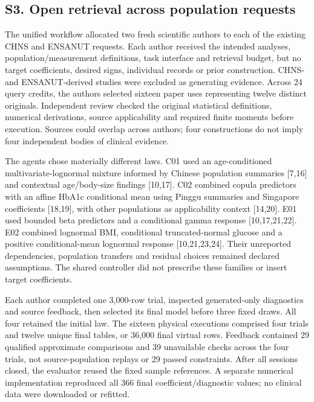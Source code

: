 \documentclass[10pt,twocolumn]{article}
\begin{document}
\subsection*{S3. Open retrieval across population requests}

The unified workflow allocated two fresh scientific authors to each of the existing CHNS and ENSANUT requests. Each author received the intended analyses, population/measurement definitions, task interface and retrieval budget, but no target coefficients, desired signs, individual records or prior construction. CHNS- and ENSANUT-derived studies were excluded as generating evidence. Across 24 query credits, the authors selected sixteen paper uses representing twelve distinct originals. Independent review checked the original statistical definitions, numerical derivations, source applicability and required finite moments before execution. Sources could overlap across authors; four constructions do not imply four independent bodies of clinical evidence.


The agents chose materially different laws. C01 used an age-conditioned multivariate-lognormal mixture informed by Chinese population summaries [7,16] and contextual age/body-size findings [10,17]. C02 combined copula predictors with an affine HbA1c conditional mean using Pinggu summaries and Singapore coefficients [18,19], with other populations as applicability context [14,20]. E01 used bounded beta predictors and a conditional gamma response [10,17,21,22]. E02 combined lognormal BMI, conditional truncated-normal glucose and a positive conditional-mean lognormal response [10,21,23,24]. Their unreported dependencies, population transfers and residual choices remained declared assumptions. The shared controller did not prescribe these families or insert target coefficients.


Each author completed one 3,000-row trial, inspected generated-only diagnostics and source feedback, then selected its final model before three fixed draws. All four retained the initial law. The sixteen physical executions comprised four trials and twelve unique final tables, or 36,000 final virtual rows. Feedback contained 29 qualified approximate comparisons and 39 unavailable checks across the four trials, not source-population replays or 29 passed constraints. After all sessions closed, the evaluator reused the fixed sample references. A separate numerical implementation reproduced all 366 final coefficient/diagnostic values; no clinical data were downloaded or refitted.
\end{document}
